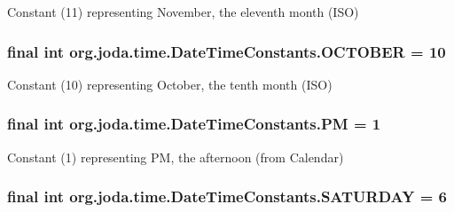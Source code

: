Constant (11) representing November, the eleventh month (I\-S\-O) \hypertarget{classorg_1_1joda_1_1time_1_1_date_time_constants_a68055b0f87102999dbd9ab9cb387958d}{
\subsubsection[{O\-C\-T\-O\-B\-E\-R}]{\setlength{\rightskip}{0pt plus 5cm}final int org.\-joda.\-time.\-Date\-Time\-Constants.\-O\-C\-T\-O\-B\-E\-R = 10\hspace{0.3cm}{\ttfamily [static]}}}\label{classorg_1_1joda_1_1time_1_1_date_time_constants_a68055b0f87102999dbd9ab9cb387958d}
Constant (10) representing October, the tenth month (I\-S\-O) \hypertarget{classorg_1_1joda_1_1time_1_1_date_time_constants_a2f88be2afd48b2a8be3e3e0d23a9c464}{
\subsubsection[{P\-M}]{\setlength{\rightskip}{0pt plus 5cm}final int org.\-joda.\-time.\-Date\-Time\-Constants.\-P\-M = 1\hspace{0.3cm}{\ttfamily [static]}}}\label{classorg_1_1joda_1_1time_1_1_date_time_constants_a2f88be2afd48b2a8be3e3e0d23a9c464}
Constant (1) representing P\-M, the afternoon (from Calendar) \hypertarget{classorg_1_1joda_1_1time_1_1_date_time_constants_a1a5c72374e3b4c88caeb251305bdd35a}{
\subsubsection[{S\-A\-T\-U\-R\-D\-A\-Y}]{\setlength{\rightskip}{0pt plus 5cm}final int org.\-joda.\-time.\-Date\-Time\-Constants.\-S\-A\-T\-U\-R\-D\-A\-Y = 6\hspace{0.3cm}{\ttfamily [static]}}}\label{classorg_1_1joda_1_1time_1_1_date_time_constants_a1a5c72374e3b4c88caeb251305bdd35a}

